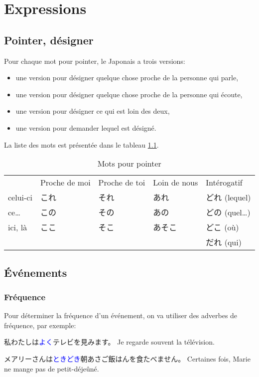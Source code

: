 \documentclass[a4paper,10pt,french,openany]{memoir}
\newcommand{\term}[1]{\textcolor{blue}{#1}}
\begin{document}
\chapter{Expressions}

\section{Pointer, désigner}

Pour chaque mot pour pointer, le Japonais a trois versions:
\begin{itemize}
 \item une version pour désigner quelque chose proche de la personne qui parle,
 \item une version pour désigner quelque chose proche de la personne qui écoute,
 \item une version pour désigner ce qui est loin des deux,
 \item une version pour demander lequel est désigné.
\end{itemize}
La liste des mots est présentée dans le tableau \cref{tab:pointer}.

\begin{table}[htp]
 \centering
 \caption{Mots pour pointer}
 \label{tab:pointer}
 \begin{tabular}{lllll}
  & Proche de moi & Proche de toi & Loin de nous & Intérogatif \\
 \cline{2-5}
 celui-ci & これ & それ & あれ & どれ (lequel) \\
 ce\dots & この & その & あの & どの (quel\dots) \\
 ici, là & ここ & そこ & あそこ & どこ (où) \\
  & & & & だれ (qui) \\
 \end{tabular}
\end{table}

\section{Événements}

\subsection{Fréquence}

Pour déterminer la fréquence d'un événement, on va utiliser des adverbes de fréquence, par exemple:
\begin{cquote}{ }
 \ruby 私{わたし}は\term{よく}テレビを\ruby 見{み}ます。
 Je regarde souvent la télévision.
 
 メアリーさんは\term{ときどき}\ruby 朝{あさ}ご\ruby 飯{はん}を\ruby 食{た}べません。
 Certaines fois, Marie ne mange pas de petit-déjeûné.
\end{cquote}
\end{document}
